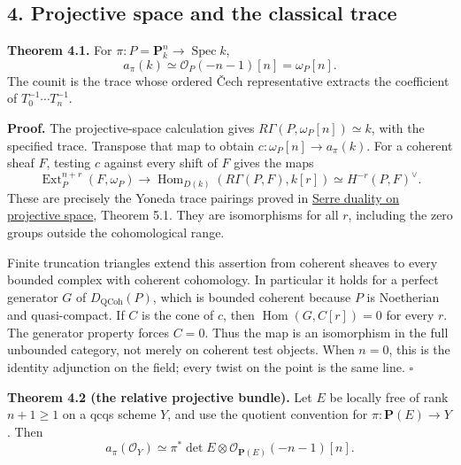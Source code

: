 \documentclass[11pt]{article}
\begin{document}
\subsection{4. Projective space and the classical
trace}\label{projective-space-and-the-classical-trace}

\textbf{Theorem 4.1.} For
\(\pi:P=\mathbf P^n_k\to\operatorname{Spec}k\), \[
a_\pi(k)\simeq\mathcal O_P(-n-1)[n]=\omega_P[n].
\tag{10}
\] The counit is the trace whose ordered Čech representative extracts
the coefficient of \(T_0^{-1}\cdots T_n^{-1}\).

\textbf{Proof.} The projective-space calculation gives
\(R\Gamma(P,\omega_P[n])\simeq k\), with the specified trace. Transpose
that map to obtain \(c:\omega_P[n]\to a_\pi(k)\). For a coherent sheaf
\(F\), testing \(c\) against every shift of \(F\) gives the maps \[
\operatorname{Ext}^{n+r}_P(F,\omega_P)
 \longrightarrow\operatorname{Hom}_{D(k)}(R\Gamma(P,F),k[r])
 \simeq H^{-r}(P,F)^\vee.
\] These are precisely the Yoneda trace pairings proved in
\href{ext-sheaves-and-serre-duality-on-projective-space.md}{Serre
duality on projective space}, Theorem 5.1. They are isomorphisms for all
\(r\), including the zero groups outside the cohomological range.

Finite truncation triangles extend this assertion from coherent sheaves
to every bounded complex with coherent cohomology. In particular it
holds for a perfect generator \(G\) of \(D_{\mathrm{QCoh}}(P)\), which
is bounded coherent because \(P\) is Noetherian and quasi-compact. If
\(C\) is the cone of \(c\), then \(\operatorname{Hom}(G,C[r])=0\) for
every \(r\). The generator property forces \(C=0\). Thus the map is an
isomorphism in the full unbounded category, not merely on coherent test
objects. When \(n=0\), this is the identity adjunction on the field;
every twist on the point is the same line. \(\square\)

\textbf{Theorem 4.2 (the relative projective bundle).} Let \(E\) be
locally free of rank \(n+1\geq1\) on a qcqs scheme \(Y\), and use the
quotient convention for \(\pi:\mathbf P(E)\to Y\). Then \[
a_\pi(\mathcal O_Y)\simeq
\pi^*\det E\otimes\mathcal O_{\mathbf P(E)}(-n-1)[n].
\tag{11}
\]
\end{document}
